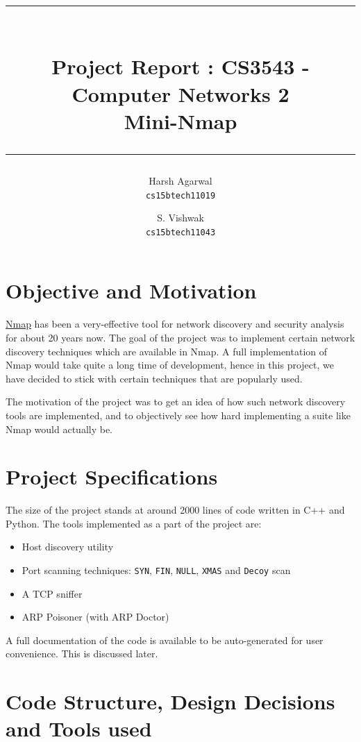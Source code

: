 \documentclass[12pt]{article}
\title{\rule{\linewidth}{2pt}\\\vspace{2mm}
Project Report : CS3543 - Computer Networks 2\\
\textbf{Mini-Nmap}\\
\rule{\linewidth}{2pt}}
\author{Harsh Agarwal\\\texttt{cs15btech11019}
\and
S. Vishwak\\\texttt{cs15btech11043}}
\date{}
\newcommand{\pbreak}{\vspace{4mm}}
\begin{document}
\maketitle
\nocite{*}

\tableofcontents
\newpage

\section{Objective and Motivation}
\href{https://nmap.org/}{Nmap} has been a very-effective tool for network discovery and security analysis for about 20 years now. The goal of the project was to implement certain network discovery techniques which are available in Nmap. A full implementation of Nmap would take quite a long time of development, hence in this project, we have decided to stick with certain techniques that are popularly used.
\pbreak

The motivation of the project was to get an idea of how such network discovery tools are implemented, and to objectively see how hard implementing a suite like Nmap would actually be.

\section{Project Specifications}
The size of the project stands at around 2000 lines of code written in C++ and Python. The tools implemented as a part of the project are:
\begin{itemize}
    \item Host discovery utility
    \item Port scanning techniques: \texttt{SYN}, \texttt{FIN}, \texttt{NULL}, \texttt{XMAS} and \texttt{Decoy} scan
    \item A TCP sniffer
    \item ARP Poisoner (with ARP Doctor)
\end{itemize}

A full documentation of the code is available to be auto-generated for user convenience. This is discussed later.

\section{Code Structure, Design Decisions and Tools used}
\end{document}
